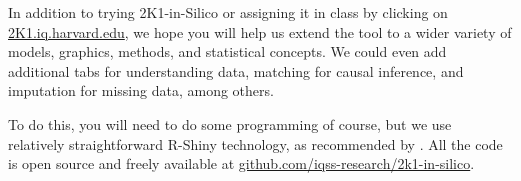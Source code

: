 \documentclass[12pt]{article}
\theoremstyle{definition}
\begin{document}
In addition to trying 2K1-in-Silico or assigning it in class by clicking on \href{https://2k1.iq.harvard.edu}{2K1.iq.harvard.edu}, we hope you will help us extend the tool to a wider variety of models, graphics, methods, and statistical concepts. We could even add additional tabs for understanding data, matching for causal inference, and imputation for missing data, among others.

To do this, you will need to do some programming of course, but we use relatively straightforward R-Shiny technology, as recommended by \citet{Metzger2022}. All the code is open source and freely available at \href{https://github.com/iqss-research/2k1-in-silico}{github.com/iqss-research/2k1-in-silico}.

\singlespace
\printbibliography
\end{document}

